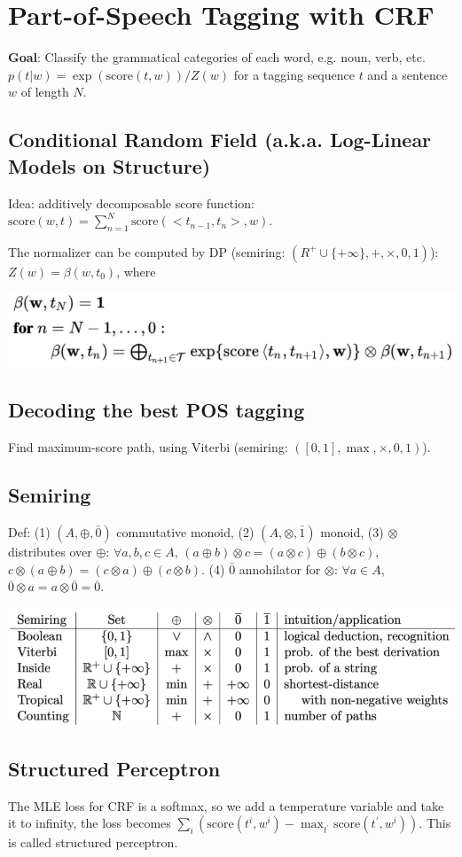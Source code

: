 \section{Part-of-Speech Tagging with CRF}

\textbf{Goal}: Classify the grammatical categories of each word, e.g. noun, verb, etc.
$p(t | w) = \exp(\text{score}(t,w))/{Z(w)}$ for a tagging sequence $t$ and a sentence $w$ of length $N$.

\subsection*{Conditional Random Field (a.k.a. Log-Linear Models on Structure)}

Idea: additively decomposable score function: $\text{score}(w,t) = \sum_{n=1}^{N} \text{score}(<t_{n-1}, t_n>, w)$.

The normalizer can be computed by DP (semiring: $(R^+ \cup \{+\infty\}, +, \times, 0, 1)$): $Z(w) = \beta(w, t_0)$, where

\vspace{-0.3cm}
\begin{center}
    \includegraphics[width=.23\textwidth]{img/CRF-normalizer.png}
\end{center}
\vspace{-0.3cm}

\subsection*{Decoding the best POS tagging}

Find maximum-score path, using Viterbi (semiring: $([0,1], \max, \times, 0, 1)$).

\subsection*{Semiring}

Def: (1) $(A, \oplus, \bar{0})$ commutative monoid, (2) $(A, \otimes, \bar{1})$ monoid, (3) $\otimes$ distributes over $\oplus$: $\forall a,b,c\in A$, $(a \oplus b) \otimes c=(a \otimes c) \oplus(b \otimes c)$,$c \otimes(a \oplus b)=(c \otimes a) \oplus(c \otimes b)$. (4) $\bar{0}$ annohilator for $\otimes$: $\forall a \in A$, $\overline{0} \otimes a=a \otimes \overline{0}=\overline{0}$.
\vspace{-0.5cm}
\begin{center}
    \includegraphics[width=\columnwidth]{img/semiring.png}
\end{center}
\vspace{-0.5cm}
\subsection*{Structured Perceptron}

The MLE loss for CRF is a softmax, so we add a temperature variable and take it to infinity, the loss becomes $\sum_i (\text{score}(t^i, w^i) - \max_{t^\prime} \text{score}(t^\prime, w^i))$. This is called structured perceptron.
